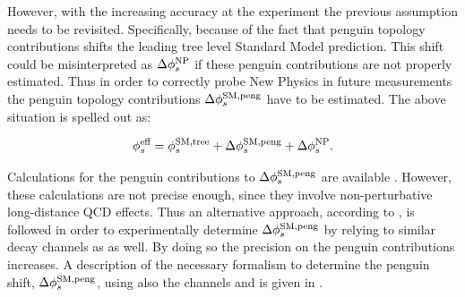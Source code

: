 However, with the increasing accuracy at the \lhcb experiment the previous assumption needs to be revisited.
Specifically, because of the fact that penguin topology contributions shifts the leading tree level Standard Model prediction.
This shift could be misinterpreted as $\Delta\phi_{s}^{\tiny\text{NP}}$ if these penguin contributions are not properly estimated.
Thus in order to correctly probe New Physics in future measurements the penguin topology contributions $\Delta\phi_{s}^{\tiny\text{SM,peng}}$
have to be estimated. The above situation is spelled out as:

\begin{equation}
\centering
 \phis^{\text {eff}} = \phis^{\tiny \text{SM,tree}} + \Delta\phiS{SM,peng} + \Delta\phis^{\tiny \text{NP}}.
 \label{phis_sm_peng}
\end{equation}

\noindent Calculations for the penguin contributions to $\Delta\phi_{s}^{\tiny\text{SM,peng}}$ are available \cite{Liu:2013nea,Frings:2015eva}.
However, these calculations are not precise enough, since they involve non-perturbative long-distance QCD effects. Thus an alternative
approach, according to \cite{DeBruyn:2014oga,Frings:2015eva,Faller:2008gt,Liu:2013nea,DeBruyn-thesis}, is followed in order to experimentally
determine $\Delta\phi_{s}^{\tiny\text{SM,peng}}$ by relying to similar decay channels as \BsJpsiPhi as well. By doing so the precision on the penguin
contributions increases. A description of the necessary formalism to determine the penguin shift, $\Delta\phi_{s}^{\tiny\text{SM,peng}}$, using also the
channels \BsJpsiKst and \BsJpsiRho is given in .
